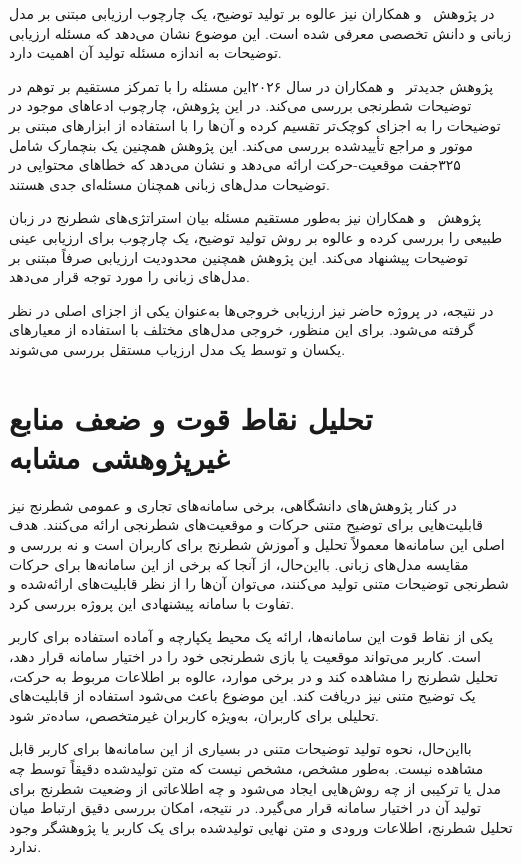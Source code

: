 در پژوهش  ~\cite{kim2025}و همکاران نیز عالوه بر تولید توضیح، یک چارچوب ارزیابی مبتنی بر مدل زبانی و دانش تخصصی معرفی شده است. این موضوع نشان می‌دهد که مسئله ارزیابی توضیحات به اندازه مسئله تولید آن اهمیت دارد.

پژوهش جدیدتر  ~\cite{hebbar2026}و همکاران در سال  ۲۰۲۶این مسئله را با تمرکز مستقیم بر توهم در توضیحات شطرنجی بررسی می‌کند. در این پژوهش، چارچوب  ادعاهای موجود در توضیحات را به اجزای کوچک‌تر تقسیم کرده و آن‌ها را با استفاده از ابزارهای مبتنی بر موتور و مراجع تأییدشده بررسی می‌کند. این پژوهش همچنین یک بنچمارک شامل  ۳۲۵جفت موقعیت-حرکت ارائه می‌دهد و نشان می‌دهد که خطاهای محتوایی در توضیحات مدل‌های زبانی همچنان مسئله‌ای جدی هستند.

پژوهش  ~\cite{cui2026}و همکاران نیز به‌طور مستقیم مسئله بیان استراتژی‌های شطرنج در زبان طبیعی را بررسی کرده و عالوه بر روش تولید توضیح، یک چارچوب برای ارزیابی عینی توضیحات پیشنهاد می‌کند. این پژوهش همچنین محدودیت ارزیابی صرفاً مبتنی بر مدل‌های زبانی را مورد توجه قرار می‌دهد.

در نتیجه، در پروژه حاضر نیز ارزیابی خروجی‌ها به‌عنوان یکی از اجزای اصلی در نظر گرفته می‌شود. برای این منظور، خروجی مدل‌های مختلف با استفاده از معیارهای یکسان و توسط یک مدل ارزیاب مستقل بررسی می‌شوند.

\section{تحلیل نقاط قوت و ضعف منابع غیرپژوهشی مشابه}

در کنار پژوهش‌های دانشگاهی، برخی سامانه‌های تجاری و عمومی شطرنج نیز قابلیت‌هایی برای توضیح متنی حرکات و موقعیت‌های شطرنجی ارائه می‌کنند. هدف اصلی این سامانه‌ها معمولاً تحلیل و آموزش شطرنج برای کاربران است و نه بررسی و مقایسه مدل‌های زبانی. بااین‌حال، از آنجا که برخی از این سامانه‌ها برای حرکات شطرنجی توضیحات متنی تولید می‌کنند، می‌توان آن‌ها را از نظر قابلیت‌های ارائه‌شده و تفاوت با سامانه پیشنهادی این پروژه بررسی کرد.

یکی از نقاط قوت این سامانه‌ها، ارائه یک محیط یکپارچه و آماده استفاده برای کاربر است. کاربر می‌تواند موقعیت یا بازی شطرنجی خود را در اختیار سامانه قرار دهد، تحلیل شطرنج را مشاهده کند و در برخی موارد، عالوه بر اطلاعات مربوط به حرکت، یک توضیح متنی نیز دریافت کند. این موضوع باعث می‌شود استفاده از قابلیت‌های تحلیلی برای کاربران، به‌ویژه کاربران غیرمتخصص، ساده‌تر شود.

بااین‌حال، نحوه تولید توضیحات متنی در بسیاری از این سامانه‌ها برای کاربر قابل مشاهده نیست. به‌طور مشخص، مشخص نیست که متن تولیدشده دقیقاً توسط چه مدل یا ترکیبی از چه روش‌هایی ایجاد می‌شود و چه اطلاعاتی از وضعیت شطرنج برای تولید آن در اختیار سامانه قرار می‌گیرد. در نتیجه، امکان بررسی دقیق ارتباط میان تحلیل شطرنج، اطلاعات ورودی و متن نهایی تولیدشده برای یک کاربر یا پژوهشگر وجود ندارد.

